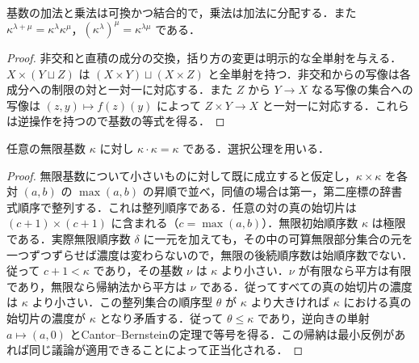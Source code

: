 \begin{prop}[基数演算の基本法則]
基数の加法と乗法は可換かつ結合的で，乗法は加法に分配する．また $\kappa^{\lambda+\mu}=\kappa^\lambda\kappa^\mu$，$(\kappa^\lambda)^\mu=\kappa^{\lambda\mu}$ である．
\end{prop}
\begin{proof}
非交和と直積の成分の交換，括り方の変更は明示的な全単射を与える．$X\times(Y\sqcup Z)$ は $(X\times Y)\sqcup(X\times Z)$ と全単射を持つ．非交和からの写像は各成分への制限の対と一対一に対応する．また $Z$ から $Y\to X$ なる写像の集合への写像は $(z,y)\mapsto f(z)(y)$ によって $Z\times Y\to X$ と一対一に対応する．これらは逆操作を持つので基数の等式を得る．
\end{proof}
\begin{prop}[無限基数の平方]
任意の無限基数 $\kappa$ に対し $\kappa\cdot\kappa=\kappa$ である．選択公理を用いる．
\end{prop}
\begin{proof}
無限基数について小さいものに対して既に成立すると仮定し，$\kappa\times\kappa$ を各対 $(a,b)$ の $\max(a,b)$ の昇順で並べ，同値の場合は第一，第二座標の辞書式順序で整列する．これは整列順序である．任意の対の真の始切片は $(c+1)\times(c+1)$ に含まれる（$c=\max(a,b)$）．無限初始順序数 $\kappa$ は極限である．実際無限順序数 $\delta$ に一元を加えても，その中の可算無限部分集合の元を一つずつずらせば濃度は変わらないので，無限の後続順序数は始順序数でない．従って $c+1<\kappa$ であり，その基数 $\nu$ は $\kappa$ より小さい．$\nu$ が有限なら平方は有限であり，無限なら帰納法から平方は $\nu$ である．従ってすべての真の始切片の濃度は $\kappa$ より小さい．この整列集合の順序型 $\theta$ が $\kappa$ より大きければ $\kappa$ における真の始切片の濃度が $\kappa$ となり矛盾する．従って $\theta\le\kappa$ であり，逆向きの単射 $a\mapsto(a,0)$ とCantor–Bernsteinの定理で等号を得る．この帰納は最小反例があれば同じ議論が適用できることによって正当化される．
\end{proof}
